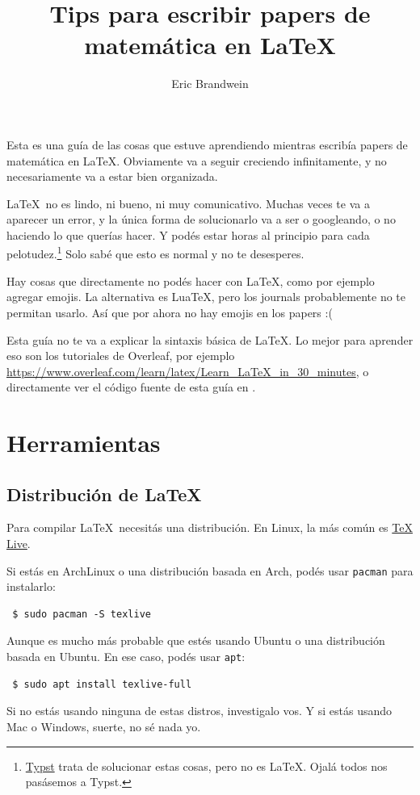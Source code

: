 \documentclass{article}
\title{Tips para escribir papers de matemática en \LaTeX}
\author{Eric Brandwein}
\begin{document}
\maketitle

Esta es una guía de las cosas que estuve aprendiendo mientras escribía papers de matemática en \LaTeX. Obviamente va a seguir creciendo infinitamente, y no necesariamente va a estar bien organizada.

\LaTeX\ no es lindo, ni bueno, ni muy comunicativo. Muchas veces te va a aparecer un error, y la única forma de solucionarlo va a ser o googleando, o no haciendo lo que querías hacer. Y podés estar horas al principio para cada pelotudez.\footnote{\href{https://typst.app/}{Typst} trata de solucionar estas cosas, pero no es \LaTeX. Ojalá todos nos pasásemos a Typst.} Solo sabé que esto es normal y no te desesperes.

Hay cosas que directamente no podés hacer con \LaTeX, como por ejemplo agregar emojis. La alternativa es LuaTeX, pero los journals probablemente no te permitan usarlo. Así que por ahora no hay emojis en los papers :(

Esta guía no te va a explicar la sintaxis básica de \LaTeX. Lo mejor para aprender eso son los tutoriales de Overleaf, por ejemplo \url{https://www.overleaf.com/learn/latex/Learn_LaTeX_in_30_minutes}, o directamente ver el código fuente de esta guía en .

\newpage
\tableofcontents

\section{Herramientas}
\subsection{Distribución de \LaTeX}
Para compilar \LaTeX\ necesitás una distribución. En Linux, la más común es \href{https://www.tug.org/texlive/}{TeX Live}.

Si estás en ArchLinux o una distribución basada en Arch, podés usar \texttt{pacman} para instalarlo:
\begin{verbatim}
 $ sudo pacman -S texlive
\end{verbatim}
Aunque es mucho más probable que estés usando Ubuntu o una distribución basada en Ubuntu. En ese caso, podés usar \texttt{apt}:
\begin{verbatim}
 $ sudo apt install texlive-full
\end{verbatim}
Si no estás usando ninguna de estas distros, investigalo vos. Y si estás usando Mac o Windows, suerte, no sé nada yo.
\end{document}
